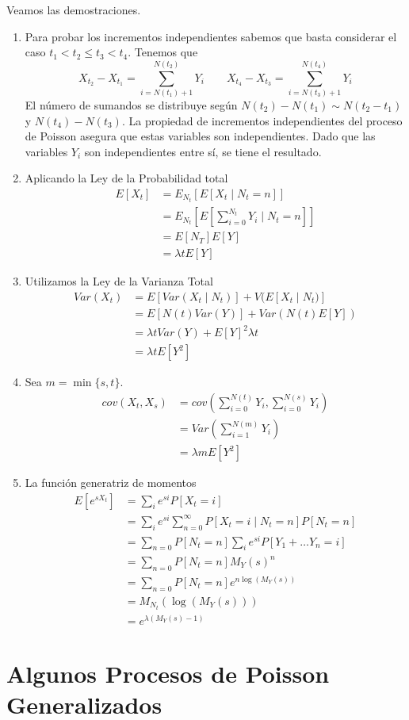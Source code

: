 \documentclass[PREyA.tex]{subfiles}
\begin{document}
\begin{dem}
Veamos las demostraciones.
\begin{enumerate}
\item Para probar los incrementos independientes sabemos que basta considerar el caso $t_1<t_2\leq t_3 <t_4$. Tenemos que
$$
X_{t_2}-X_{t_1} = \sum_{i=N(t_1)+1}^{N(t_2)} Y_i \qquad X_{t_4}-X_{t_3} = \sum_{i=N(t_3)+1}^{N(t_4)} Y_i
$$
El número de sumandos se distribuye según $N(t_2)-N(t_1) \sim N(t_2-t_1)$ y $N(t_4)-N(t_3)$. La propiedad de incrementos independientes del proceso de Poisson asegura que estas variables son independientes. Dado que las variables $Y_i$ son independientes entre sí, se tiene el resultado.
\item Aplicando la Ley de la Probabilidad total
\begin{align*}
E[X_t] &= E_{N_t}\left[E\left[ X_t \mid N_t = n\right]\right] \\
&=E_{N_t}\left[E\left[\sum_{i=0}^{N_t} Y_i \mid N_t = n\right]\right]\\
&=E[N_T]E[Y]\\
&=\lambda tE[Y]
\end{align*}		
\item Utilizamos la Ley de la Varianza Total
\begin{align*}
Var(X_t) &= E[Var(X_t\mid N_t)]+V(E[X_t\mid N_t)]\\
&=E[N(t)Var(Y)]+Var(N(t)E[Y])\\
&=\lambda t Var(Y)+ E[Y]^2 \lambda t\\
&=\lambda t E[Y^2]
\end{align*}
\item Sea $m=\min\{s,t\}$.
\begin{align*}
cov(X_t,X_s)&=cov\left(\sum_{i=0}^{N(t)} Y_i,\sum_{i=0}^{N(s)} Y_i\right)\\
&= Var\left(\sum_{i=1}^{N(m)} Y_i\right)\\
&=\lambda m E[Y^2] 
\end{align*}
\item La función generatriz de momentos
\begin{align*}
E[e^{sX_t}] &=\sum_i e^{si}P[X_t = i]\\
&=\sum_i e^{si}\sum_{n=0}^\infty P[X_t = i\mid N_t =n ] P[N_t = n]\\
&=\sum_{n=0} P[N_t=n]\sum_i  e^{si} P[Y_1+ \dotsc Y_n = i ]\\
&=\sum_{n=0} P[N_t=n] M_Y(s)^n\\
&= \sum_{n=0} P[N_t=n]e^{n\log(M_Y(s))} \\
&= M_{N_t}(\log(M_Y(s)))\\
&=e^{\lambda(M_Y(s)-1)}
\end{align*}

\end{enumerate}
\end{dem}


\section{Algunos Procesos de Poisson Generalizados}
\end{document}
